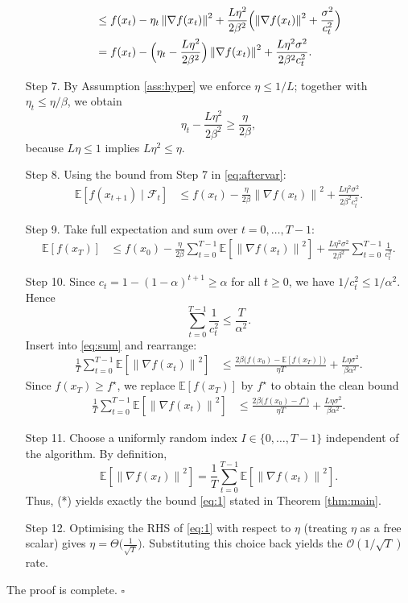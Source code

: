 \documentclass{article}
\newcommand{\E}{\mathbb{E}}
\newcommand{\norm}[1]{\left\lVert#1\right\rVert}
\begin{document}
\begin{enumerate}
\begin{align}
&\le f(x_t)-\eta_t\norm{\nabla f(x_t)}^{2}
   +\frac{L\eta^{2}}{2\beta^{2}}
      \Bigl(\norm{\nabla f(x_t)}^{2}
            +\frac{\sigma^{2}}{c_t^{2}}\Bigr) \nonumber\\
&= f(x_t)-\Bigl(\eta_t-\frac{L\eta^{2}}{2\beta^{2}}\Bigr)\norm{\nabla f(x_t)}^{2}
   +\frac{L\eta^{2}\sigma^{2}}{2\beta^{2}c_t^{2}} . \label{eq:aftervar}
\end{align}
\item[Step 7.] By Assumption \ref{ass:hyper} we enforce $\eta\le 1/L$; together with $\eta_t\le \eta/\beta$, we obtain
\[
\eta_t-\frac{L\eta^{2}}{2\beta^{2}}\ge \frac{\eta}{2\beta},
\]
because $L\eta\le 1$ implies $L\eta^{2}\le \eta$.
\item[Step 8.] Using the bound from Step 7 in \eqref{eq:aftervar}:
\begin{align}
\E\!\left[f(x_{t+1})\mid\mathcal{F}_t\right]
&\le f(x_t)-\frac{\eta}{2\beta}\norm{\nabla f(x_t)}^{2}
   +\frac{L\eta^{2}\sigma^{2}}{2\beta^{2}c_t^{2}} . \label{eq:final-rec}
\end{align}
\item[Step 9.] Take full expectation and sum over $t=0,\dots,T-1$:
\begin{align}
\E[f(x_T)] &\le f(x_0)-\frac{\eta}{2\beta}\sum_{t=0}^{T-1}\E\!\left[\norm{\nabla f(x_t)}^{2}\right]
            +\frac{L\eta^{2}\sigma^{2}}{2\beta^{2}}\sum_{t=0}^{T-1}\frac{1}{c_t^{2}} . \label{eq:sum}
\end{align}
\item[Step 10.] Since $c_t=1-(1-\alpha)^{t+1}\ge \alpha$ for all $t\ge0$, we have $1/c_t^{2}\le 1/\alpha^{2}$. Hence
\[
\sum_{t=0}^{T-1}\frac{1}{c_t^{2}}\le \frac{T}{\alpha^{2}} .
\]
Insert into \eqref{eq:sum} and rearrange:
\begin{align}
\frac{1}{T}\sum_{t=0}^{T-1}\E\!\left[\norm{\nabla f(x_t)}^{2}\right]
&\le \frac{2\beta\big(f(x_0)-\E[f(x_T)]\big)}{\eta T}
   +\frac{L\eta\sigma^{2}}{\beta\alpha^{2}} . \label{eq:avg}
\end{align}
Since $f(x_T)\ge f^\star$, we replace $\E[f(x_T)]$ by $f^\star$ to obtain the clean bound
\begin{align}
\frac{1}{T}\sum_{t=0}^{T-1}\E\!\left[\norm{\nabla f(x_t)}^{2}\right]
&\le \frac{2\beta\big(f(x_0)-f^\star\big)}{\eta T}
   +\frac{L\eta\sigma^{2}}{\beta\alpha^{2}} . \tag{*}
\end{align}
\item[Step 11.] Choose a uniformly random index $I\in\{0,\dots,T-1\}$ independent of the algorithm. By definition,
\[
\E\!\left[\norm{\nabla f(x_I)}^{2}\right]=\frac{1}{T}\sum_{t=0}^{T-1}\E\!\left[\norm{\nabla f(x_t)}^{2}\right].
\]
Thus, (*) yields exactly the bound \eqref{eq:1} stated in Theorem \ref{thm:main}.
\item[Step 12.] Optimising the RHS of \eqref{eq:1} with respect to $\eta$ (treating $\eta$ as a free scalar) gives $\eta = \Theta\!\big(\frac{1}{\sqrt{T}}\big)$. Substituting this choice back yields the $\mathcal{O}(1/\sqrt{T})$ rate.
\end{enumerate}
The proof is complete. $\square$
\end{document}
